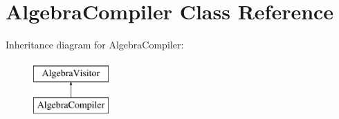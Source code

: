 \hypertarget{class_algebra_compiler}{\section{Algebra\+Compiler Class Reference}
\label{class_algebra_compiler}
}
Inheritance diagram for Algebra\+Compiler\+:\begin{figure}[H]
\begin{center}
\leavevmode
\includegraphics[height=2.000000cm]{class_algebra_compiler}
\end{center}
\end{figure}
